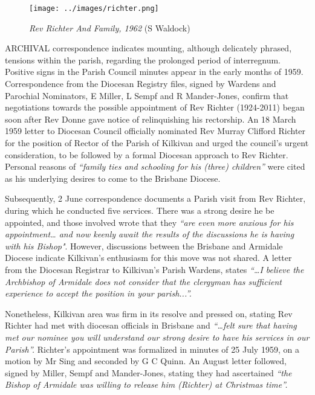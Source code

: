 \begin{figure}
\begin{center}
\texttt{[image: ../images/richter.png]}
\caption{{\itshape Rev Richter And Family, 1962} {\scriptsize(S Waldock)}}
\end{center}
\end{figure}




\lettrine[lines=3]{A}{RCHIVAL}
 correspondence indicates mounting, although delicately phrased, tensions within the parish, regarding the prolonged period of interregnum. Positive signs in the Parish Council minutes appear in the early months of 1959. Correspondence from the Diocesan Registry files, signed by Wardens and Parochial Nominators, E Miller, L Sempf and R Mander-Jones, confirm that negotiations towards the possible appointment of Rev Richter (1924-2011) began soon after Rev Donne gave notice of relinquishing his rectorship. An 18 March 1959 letter to Diocesan Council officially nominated Rev Murray Clifford Richter for the position of Rector of the Parish of Kilkivan and urged the council's urgent consideration, to be followed by a formal Diocesan approach to Rev Richter. Personal reasons of \emph{``family ties and schooling for his (three) children''} were cited as his underlying desires to come to the Brisbane Diocese.

Subsequently, 2 June correspondence documents a Parish visit from Rev Richter, during which he conducted five services. There was a strong desire he be appointed, and those involved wrote that they \emph{``are even more anxious for his appointment\ldots{} and now keenly await the results of the discussions he is having with his Bishop"}. However, discussions between the Brisbane and Armidale Diocese indicate Kilkivan's enthusiasm for this move was not shared. A letter from the Diocesan Registrar to Kilkivan's Parish Wardens, states \emph{``\ldots I believe the Archbishop of Armidale does not consider that the clergyman has sufficient experience to accept the position in your parish...''.}



Nonetheless, Kilkivan area was firm in its resolve and pressed on, stating Rev Richter had met with diocesan officials in Brisbane and \emph{``\ldots felt sure that having met our nominee you will understand our strong desire to have his services in our Parish''.} Richter's appointment was formalized in minutes of 25 July 1959, on a motion by Mr Sing and seconded by G C Quinn. An August letter followed, signed by Miller, Sempf and Mander-Jones, stating they had ascertained \emph{``the Bishop of Armidale was willing to release him (Richter) at Christmas time''.}



